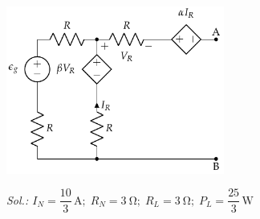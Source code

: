 \begin{enumerate}
    \begin{center}
      \includegraphics[height=5.5cm]{../figs/norton.pdf}
    \end{center}

\emph{Sol.:\;
  $I_N=\dfrac{10}{3}\,\si{\ampere};\; R_N=\qty{3}{\ohm};\; R_L=\qty{3}{\ohm};\;
  P_L=\dfrac{25}{3}\,\si{\watt}$}

\end{enumerate}

